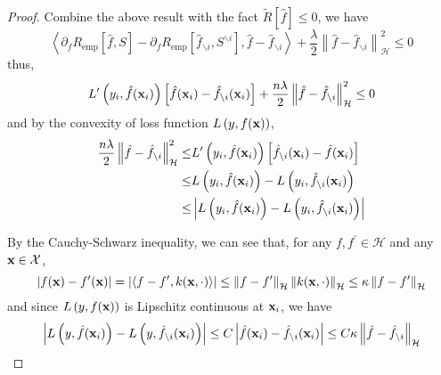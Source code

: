\begin{proof}
	Combine the above result with the fact $\tilde{R}[\hat{f}]\leq 0$, we have
	\begin{equation}
		\left\langle\partial_{f}R_{\text{emp}}\left[\hat{f},S\right]-\partial_{f}R_{\text{emp}}\left[\hat{f}_{\backslash i},S^{\backslash i}\right],\hat{f}-\hat{f}_{\backslash i}\right\rangle+\frac{\lambda}{2}\left\|\hat{f}-\hat{f}_{\backslash i}\right\|_{\mathcal{H}}^{2}\leq 0
	\end{equation}
	thus,
	\begin{equation}
		L^{\prime}\left(y_{i},\hat{f}({\bf x}_{i})\right)\left[\hat{f}({\bf x}_{i})-\hat{f}_{\backslash i}({\bf x}_{i})\right]+\frac{n\lambda}{2}\left\|\hat{f}-\hat{f}_{\backslash i}\right\|_{\mathcal{H}}^{2}\leq 0
	\end{equation}
	and by the convexity of loss function $L\left(y,f({\bf x})\right)$,
	\begin{equation}
		\label{eq:rkhs-norm-by-derviative-of-tilde-R}
		\begin{aligned}
			\frac{n\lambda}{2}\left\|\hat{f}-\hat{f}_{\backslash i}\right\|_{\mathcal{H}}^{2}\leq & L^{\prime}\left(y_{i},\hat{f}({\bf x}_{i})\right)\left[\hat{f}_{\backslash i}({\bf x}_{i})-\hat{f}({\bf x}_{i})\right] \\
			\leq                                                                                  & L\left(y_{i},\hat{f}({\bf x}_{i})\right)-L\left(y_{i},\hat{f}_{\backslash i}({\bf x}_{i})\right)                    \\
			\leq                                                                                  & \left|L\left(y_{i},\hat{f}({\bf x}_{i})\right)-L\left(y_{i},\hat{f}_{\backslash i}({\bf x}_{i})\right)\right|
		\end{aligned}
	\end{equation}

	By the Cauchy-Schwarz inequality, we can see that, for any $f,f^{\prime}\in\mathcal{H}$ and any ${\bf x}\in\mathcal{X}$,
	\begin{equation}
		\left|f({\bf x})-f^{\prime}({\bf x})\right|=\left|\left\langle f-f^{\prime},k({\bf x},\cdot)\right\rangle\right|\leq\left\|f-f^{\prime}\right\|_{\mathcal{H}}\left\|k({\bf x},\cdot)\right\|_{\mathcal{H}}\leq\kappa\left\|f-f^{\prime}\right\|_{\mathcal{H}}
	\end{equation}
	and since $L\left(y,f({\bf x})\right)$ is Lipschitz continuous at ${\bf x}_{i}$,  we have
	\begin{equation}
		\label{eq:rkhs-norm-by-lipshitz-continuous}
		\left|L\left(y,\hat{f}({\bf x}_{i})\right)-L\left(y,\hat{f}_{\backslash i}({\bf x}_{i})\right)\right|\leq C\left|\hat{f}({\bf x}_{i})-\hat{f}_{\backslash i}({\bf x}_{i})\right|\leq C\kappa\left\|\hat{f}-\hat{f}_{\backslash i}\right\|_{\mathcal{H}}
	\end{equation}


\end{proof}

